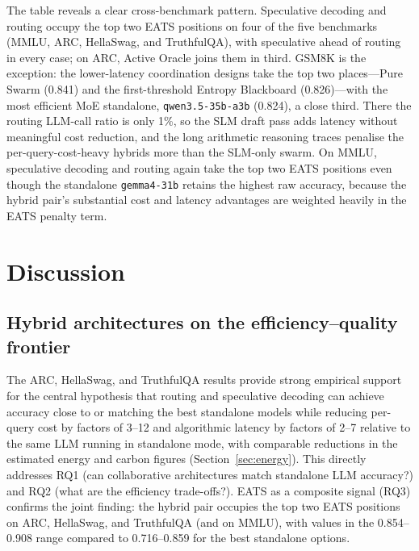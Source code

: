 The table reveals a clear cross-benchmark pattern. Speculative decoding and routing occupy the top two EATS positions on four of the five benchmarks (MMLU, ARC, HellaSwag, and TruthfulQA), with speculative ahead of routing in every case; on ARC, Active Oracle joins them in third. GSM8K is the exception: the lower-latency coordination designs take the top two places---Pure Swarm (0.841) and the first-threshold Entropy Blackboard (0.826)---with the most efficient MoE standalone, \texttt{qwen3.5-35b-a3b} (0.824), a close third. There the routing LLM-call ratio is only 1\%, so the SLM draft pass adds latency without meaningful cost reduction, and the long arithmetic reasoning traces penalise the per-query-cost-heavy hybrids more than the SLM-only swarm. On MMLU, speculative decoding and routing again take the top two EATS positions even though the standalone \texttt{gemma4-31b} retains the highest raw accuracy, because the hybrid pair's substantial cost and latency advantages are weighted heavily in the EATS penalty term.

\section{Discussion}
\label{sec:exp-discussion}

\subsection{Hybrid architectures on the efficiency--quality frontier}
The ARC, HellaSwag, and TruthfulQA results provide strong empirical support for the central hypothesis that routing and speculative decoding can achieve accuracy close to or matching the best standalone models while reducing per-query cost by factors of 3--12 and algorithmic latency by factors of 2--7 relative to the same LLM running in standalone mode, with comparable reductions in the estimated energy and carbon figures (Section~\ref{sec:energy}). This directly addresses RQ1 (can collaborative architectures match standalone LLM accuracy?) and RQ2 (what are the efficiency trade-offs?). EATS as a composite signal (RQ3) confirms the joint finding: the hybrid pair occupies the top two EATS positions on ARC, HellaSwag, and TruthfulQA (and on MMLU), with values in the 0.854--0.908 range compared to 0.716--0.859 for the best standalone options.

